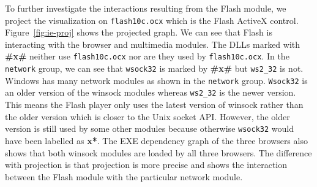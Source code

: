 To further investigate the interactions resulting from the Flash module,
we project the visualization on {\tt flash10c.ocx} which is
the Flash ActiveX control.
Figure~\ref{fig:ie-proj} shows the projected graph.
We can see that Flash  is interacting with the
browser and multimedia modules.
The DLLs marked with {\bf \#x\#} neither use {\tt flash10c.ocx}
nor are they used by {\tt flash10c.ocx}.
In the {\tt network}  group,
we can see that {\tt wsock32} is marked by {\bf \#x\#} but
{\tt ws2\_32} is not.
Windows has many network modules as shown in the {\tt network} group.
{\tt Wsock32} is an
older version of the winsock modules whereas {\tt ws2\_32} is the newer version.
This means the Flash player only uses the latest version of winsock rather
than the older version which is closer to the Unix socket API.
However, the older version is still used by some other modules
because otherwise {\tt wsock32} would have been labelled as {\bf *x*}.
The EXE dependency graph of the three browsers also shows that
both winsock modules are loaded by all three browsers.
The difference with projection is that projection is
more precise and shows the interaction between
the Flash module with the particular network module.

